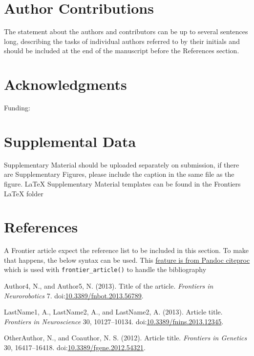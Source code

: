 \documentclass[utf8]{frontiersSCNS}
\newlength{\cslhangindent}
\newlength{\cslentryspacingunit} %
\newenvironment{CSLReferences}[2] %
 {%
  \setlength{\parindent}{0pt}
  \ifodd #1
  \let\oldpar\par
  \def\par{\hangindent=\cslhangindent\oldpar}
  \fi
  \setlength{\parskip}{#2\cslentryspacingunit}
 }%
 {}
\begin{document}
\hypertarget{author-contributions}{%
\section*{Author Contributions}\label{author-contributions}}

The statement about the authors and contributors can be up to several
sentences long, describing the tasks of individual authors referred to
by their initials and should be included at the end of the manuscript
before the References section.

\hypertarget{acknowledgments}{%
\section*{Acknowledgments}\label{acknowledgments}}

Funding:

\hypertarget{supplemental-data}{%
\section{Supplemental Data}\label{supplemental-data}}

Supplementary Material should be uploaded separately on submission, if
there are Supplementary Figures, please include the caption in the same
file as the figure. LaTeX Supplementary Material templates can be found
in the Frontiers LaTeX folder

\hypertarget{references}{%
\section{References}\label{references}}

A Frontier article expect the reference list to be included in this
section. To make that happens, the below syntax can be used. This
\href{https://pandoc.org/MANUAL.html\#placement-of-the-bibliography}{feature
is from Pandoc citeproc} which is used with \texttt{frontier\_article()}
to handle the bibliography

\hypertarget{refs}{}
\begin{CSLReferences}{1}{0}
\leavevmode{}%
Author4, N., and Author5, N. (2013). Title of the article.
\emph{Frontiers in Neurorobotics} 7.
doi:\href{https://doi.org/10.3389/fnbot.2013.56789}{10.3389/fnbot.2013.56789}.

\leavevmode{}%
LastName1, A., LastName2, A., and LastName2, A. (2013). Article title.
\emph{Frontiers in Neuroscience} 30, 10127--10134.
doi:\href{https://doi.org/10.3389/fnins.2013.12345}{10.3389/fnins.2013.12345}.

\leavevmode{}%
OtherAuthor, N., and Coauthor, N. S. (2012). Article title.
\emph{Frontiers in Genetics} 30, 16417--16418.
doi:\href{https://doi.org/10.3389/fgene.2012.54321}{10.3389/fgene.2012.54321}.

\end{CSLReferences}
\end{document}
